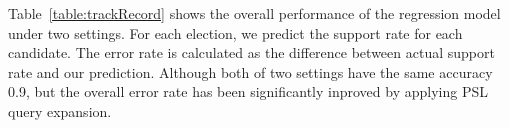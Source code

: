 Table~\ref{table:trackRecord} shows the overall performance of the regression model under two settings. For each election, we predict the support rate for each candidate. The error rate is calculated as the difference between actual support rate and our prediction.
Although both of two settings have the same accuracy 0.9, but the overall error rate has been significantly inproved by applying PSL query expansion. 

